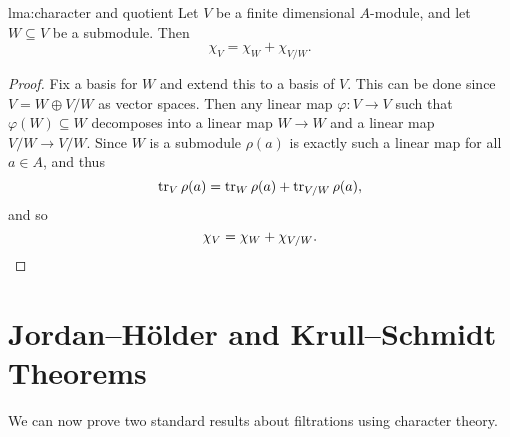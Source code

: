 \begin{lma}{}{lma:character and quotient}
    Let \(V\) be a finite dimensional \(A\)-module, and let \(W \subseteq V\) be a submodule.
    Then
    \begin{equation}
        \chi_V = \chi_W + \chi_{V/W}.
    \end{equation}
    \begin{proof}
        Fix a basis for \(W\) and extend this to a basis of \(V\).
        This can be done since \(V = W \oplus V/W\) as vector spaces.
        Then any linear map \(\varphi \colon V \to V\) such that \(\varphi(W) \subseteq W\) decomposes into a linear map \(W \to W\) and a linear map \(V/W \to V/W\).
        Since \(W\) is a submodule \(\rho(a)\) is exactly such a linear map for all \(a \in A\), and thus
        \begin{equation}
            \operatorname{tr}_V \rho(a) = \operatorname{tr}_W \rho(a) + \operatorname{tr}_{V/W} \rho(a),
        \end{equation}
        and so
        \begin{equation*}
            \chi_V = \chi_W + \chi_{V/W}. \qedhere
        \end{equation*}
    \end{proof}
\end{lma}

\section{Jordan--H\"older and Krull--Schmidt Theorems}
We can now prove two standard results about filtrations using character theory.

